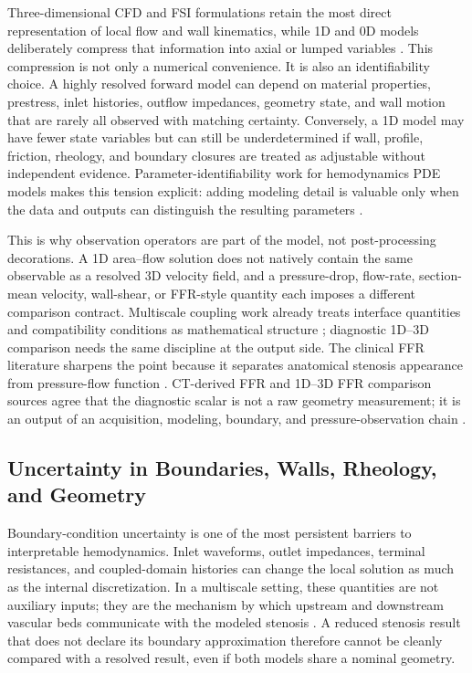 Three-dimensional CFD and FSI formulations retain the most direct representation
of local flow and wall kinematics, while 1D and 0D models deliberately compress
that information into axial or lumped variables
\cite{FormaggiaEtAl2007FSICoupling,QuarteroniVeneziani2003GeometricalMultiscale,ShiEtAl2011BloodFlowModelReview}.
This compression is not only a numerical convenience. It is also an
identifiability choice. A highly resolved forward model can depend on material
properties, prestress, inlet histories, outflow impedances, geometry state, and
wall motion that are rarely all observed with matching certainty. Conversely, a
1D model may have fewer state variables but can still be underdetermined if wall,
profile, friction, rheology, and boundary closures are treated as adjustable
without independent evidence. Parameter-identifiability work for hemodynamics
PDE models makes this tension explicit: adding modeling detail is valuable only
when the data and outputs can distinguish the resulting parameters
\cite{Colebank2025HemodynamicsIdentifiability}.

This is why observation operators are part of the model, not post-processing
decorations. A 1D area--flow solution does not natively contain the same
observable as a resolved 3D velocity field, and a pressure-drop, flow-rate,
section-mean velocity, wall-shear, or FFR-style quantity each imposes a different
comparison contract. Multiscale coupling work already treats interface
quantities and compatibility conditions as mathematical structure
\cite{FormaggiaEtAl2007FSICoupling,QuarteroniVeneziani2003GeometricalMultiscale};
diagnostic 1D--3D comparison needs the same discipline at the output side.
The clinical FFR literature sharpens the point because it separates anatomical
stenosis appearance from pressure-flow function
\cite{ToninoEtAl2010FAMEAngioFunctional,TebaldiEtAl2015FFROverview}. CT-derived
FFR and 1D--3D FFR comparison sources agree that the diagnostic scalar is not a
raw geometry measurement; it is an output of an acquisition, modeling, boundary,
and pressure-observation chain
\cite{NorgaardEtAl2014NXTFFRCT,Blanco2018FFR1D3D,ShaikhEtAl2025CTFFR}.

\subsection{Uncertainty in Boundaries, Walls, Rheology, and Geometry}
\label{subsec:synthesis-closure-geometry-uncertainty}

Boundary-condition uncertainty is one of the most persistent barriers to
interpretable hemodynamics. Inlet waveforms, outlet impedances, terminal
resistances, and coupled-domain histories can change the local solution as much
as the internal discretization. In a multiscale setting, these quantities are not
auxiliary inputs; they are the mechanism by which upstream and downstream
vascular beds communicate with the modeled stenosis
\cite{QuarteroniVeneziani2003GeometricalMultiscale,FormaggiaEtAl2007FSICoupling}.
A reduced stenosis result that does not declare its boundary approximation
therefore cannot be cleanly compared with a resolved result, even if both
models share a nominal geometry.

